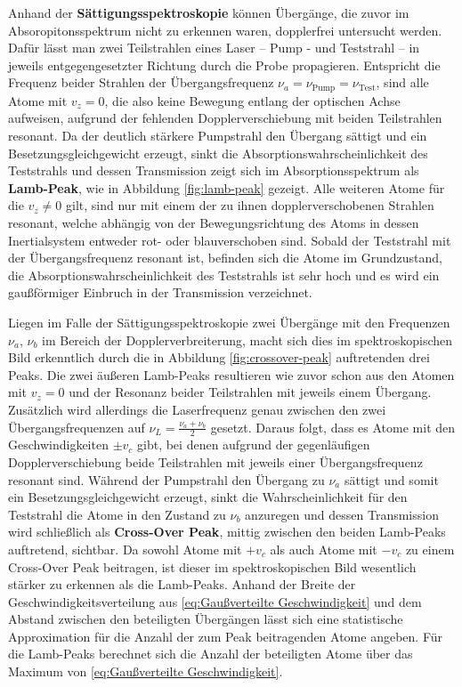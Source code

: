 \noindent Anhand der \textbf{Sättigungsspektroskopie} können Übergänge, die zuvor im Absoropitonsspektrum nicht zu erkennen waren, dopplerfrei untersucht werden. Dafür lässt man zwei Teilstrahlen eines Laser -- Pump
- und Teststrahl -- in jeweils entgegengesetzter Richtung durch die Probe propagieren. Entspricht die Frequenz beider Strahlen der Übergangsfrequenz $\nu_{a}=\nu_{\text{Pump}}=\nu_{\text{Test}}$, sind alle Atome mit  $v_{z}=0$, die also keine Bewegung entlang der optischen Achse aufweisen, aufgrund der fehlenden Dopplerverschiebung mit beiden Teilstrahlen resonant. Da der deutlich stärkere Pumpstrahl den Übergang sättigt und ein Besetzungsgleichgewicht erzeugt, sinkt die Absorptionswahrscheinlichkeit des Teststrahls und dessen Transmission zeigt sich im Absorptionsspektrum als \textbf{Lamb-Peak}, wie in Abbildung  \ref{fig:lamb-peak} gezeigt. Alle weiteren Atome für die $v_{z}\neq 0$ gilt, sind nur mit einem der zu ihnen dopplerverschobenen Strahlen resonant, welche abhängig von der Bewegungsrichtung des Atoms in dessen Inertialsystem entweder rot- oder blauverschoben sind. Sobald der Teststrahl mit der Übergangsfrequenz resonant ist, befinden sich die Atome im Grundzustand, die Absorptionswahrscheinlichkeit des Teststrahls ist sehr hoch und es wird ein gaußförmiger Einbruch in der Transmission verzeichnet. 

\noindent Liegen im Falle der Sättigungsspektroskopie zwei Übergänge mit den Frequenzen $\nu_{a}$, $\nu_{b}$ im Bereich der Dopplerverbreiterung, macht sich dies im spektroskopischen Bild erkenntlich durch die in Abbildung \ref{fig:crossover-peak} auftretenden drei Peaks. Die zwei äußeren Lamb-Peaks resultieren wie zuvor schon aus den Atomen mit $v_{z}=0$ und der Resonanz beider Teilstrahlen mit jeweils einem Übergang. Zusätzlich wird allerdings die Laserfrequenz genau zwischen den zwei Übergangsfrequenzen auf $\nu_{L}=\frac{\nu_{a}+\nu_{b}}{2}$ gesetzt. Daraus folgt, dass es Atome mit den Geschwindigkeiten $\pm v_{c}$ gibt, bei denen aufgrund der gegenläufigen Dopplerverschiebung beide Teilstrahlen mit jeweils einer Übergangsfrequenz resonant sind. Während der Pumpstrahl den Übergang zu $\nu_{a}$ sättigt und somit ein Besetzungsgleichgewicht erzeugt, sinkt die Wahrscheinlichkeit für den Teststrahl die Atome in den Zustand zu $\nu_{b}$ anzuregen und dessen Transmission wird schließlich als \textbf{Cross-Over Peak}, mittig zwischen den beiden Lamb-Peaks auftretend, sichtbar. Da sowohl Atome mit $+v_{c}$ als auch Atome mit $-v_{c}$ zu einem Cross-Over Peak beitragen, ist dieser im spektroskopischen Bild wesentlich stärker zu erkennen als die Lamb-Peaks. Anhand der Breite der Geschwindigkeitsverteilung aus \ref{eq:Gaußverteilte Geschwindigkeit} und dem Abstand zwischen den beteiligten Übergängen lässt sich eine statistische Approximation für die Anzahl der zum Peak beitragenden Atome angeben. Für die Lamb-Peaks berechnet sich die Anzahl der beteiligten Atome über das Maximum von \ref{eq:Gaußverteilte Geschwindigkeit}.\cite{H2}


